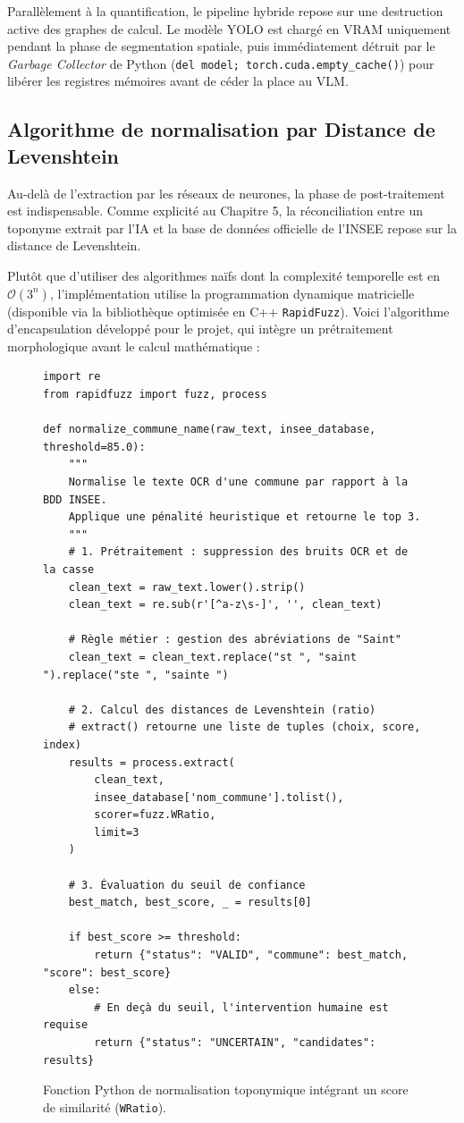 Parallèlement à la quantification, le pipeline hybride repose sur une destruction active des graphes de calcul. Le modèle YOLO est chargé en VRAM uniquement pendant la phase de segmentation spatiale, puis immédiatement détruit par le \textit{Garbage Collector} de Python (\texttt{del model; torch.cuda.empty\_cache()}) pour libérer les registres mémoires avant de céder la place au VLM.

\subsection{Algorithme de normalisation par Distance de Levenshtein}

Au-delà de l'extraction par les réseaux de neurones, la phase de post-traitement est indispensable. Comme explicité au Chapitre 5, la réconciliation entre un toponyme extrait par l'IA et la base de données officielle de l'INSEE repose sur la distance de Levenshtein. 

Plutôt que d'utiliser des algorithmes naïfs dont la complexité temporelle est en $\mathcal{O}(3^n)$, l'implémentation utilise la programmation dynamique matricielle (disponible via la bibliothèque optimisée en C++ \texttt{RapidFuzz}). Voici l'algorithme d'encapsulation développé pour le projet, qui intègre un prétraitement morphologique avant le calcul mathématique :

\begin{figure}[H]
\begin{verbatim}
import re
from rapidfuzz import fuzz, process

def normalize_commune_name(raw_text, insee_database, threshold=85.0):
    """
    Normalise le texte OCR d'une commune par rapport à la BDD INSEE.
    Applique une pénalité heuristique et retourne le top 3.
    """
    # 1. Prétraitement : suppression des bruits OCR et de la casse
    clean_text = raw_text.lower().strip()
    clean_text = re.sub(r'[^a-z\s-]', '', clean_text)
    
    # Règle métier : gestion des abréviations de "Saint"
    clean_text = clean_text.replace("st ", "saint ").replace("ste ", "sainte ")

    # 2. Calcul des distances de Levenshtein (ratio) 
    # extract() retourne une liste de tuples (choix, score, index)
    results = process.extract(
        clean_text, 
        insee_database['nom_commune'].tolist(),
        scorer=fuzz.WRatio, 
        limit=3
    )
    
    # 3. Évaluation du seuil de confiance
    best_match, best_score, _ = results[0]
    
    if best_score >= threshold:
        return {"status": "VALID", "commune": best_match, "score": best_score}
    else:
        # En deçà du seuil, l'intervention humaine est requise
        return {"status": "UNCERTAIN", "candidates": results}
\end{verbatim}
\caption{Fonction Python de normalisation toponymique intégrant un score de similarité (\texttt{WRatio}).}
\end{figure}

